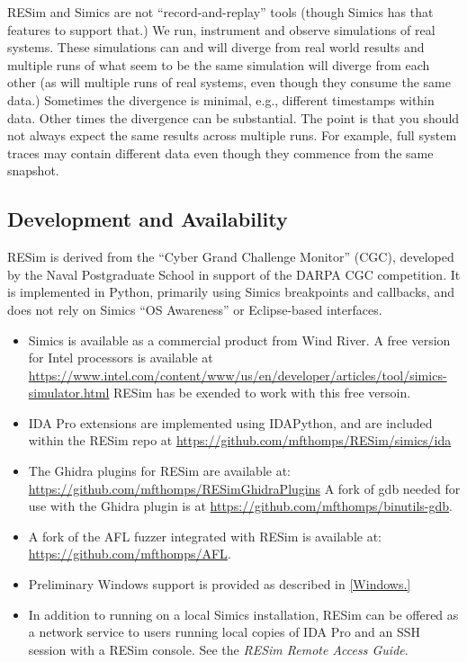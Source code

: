 \documentclass[titlepage]{article}
\begin{document}
RESim and Simics are not ``record-and-replay'' tools (though Simics has that features to support that.)  We run, instrument and observe simulations of real systems.
These simulations can and will diverge from real world results and multiple runs of what seem to be the same simulation will diverge from each other (as will
multiple runs of real systems, even though they consume the same data.)  Sometimes the divergence is minimal, e.g., different timestamps within data.  Other times
the divergence can be substantial.  The point is that you should not always expect the same results across multiple runs.  For example, full system traces
may contain different data even though they commence from the same snapshot.  

\subsection{Development and Availability}
RESim is derived from the “Cyber Grand Challenge Monitor” (CGC), developed by the Naval Postgraduate School in support of the DARPA CGC competition.  
It is implemented in Python, primarily using Simics breakpoints and callbacks, and does not rely on 
Simics “OS Awareness” or Eclipse-based interfaces.   
\begin{itemize}
\item Simics is available as a commercial product from Wind River.  A free version for Intel processors is available at
\url{https://www.intel.com/content/www/us/en/developer/articles/tool/simics-simulator.html}  RESim has be exended to work with this
free versoin.

\item IDA Pro extensions are implemented using IDAPython, and are included within the RESim repo at
\url{https://github.com/mfthomps/RESim/simics/ida}  

\item The Ghidra plugins for RESim are available at: \url{https://github.com/mfthomps/RESimGhidraPlugins}  A fork 
of gdb needed for use with the Ghidra plugin is at \url{https://github.com/mfthomps/binutils-gdb}.

\item A fork of the AFL fuzzer integrated with 
RESim is available at: \url{https://github.com/mfthomps/AFL}.

\item Preliminary Windows support is provided as described in \ref{Windows.}

\item In addition to running on a local Simics installation, RESim can be offered as a network service to users running local copies of IDA Pro and an SSH session with a RESim console.  See the \textit{RESim Remote Access Guide}.  
\end{itemize}
\end{document}
